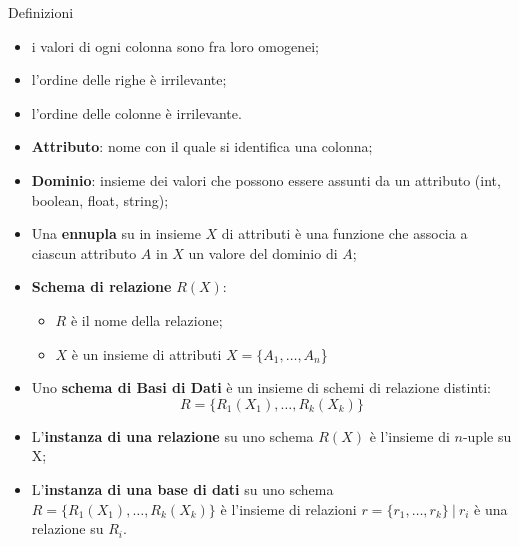 \begin{frame}[allowframebreaks]{Definizioni}
\begin{itemize}
            \item i valori di ogni colonna sono fra loro omogenei;
            \item l'ordine delle righe \`e irrilevante;
            \item l'ordine delle colonne \`e irrilevante.
        \end{itemize}
        \framebreak
        \begin{itemize}
            \item \textbf{Attributo}: nome con il quale si identifica una colonna;
            \item \textbf{Dominio}: insieme dei valori che possono essere assunti da un attributo (int, boolean, float, string);
            \item Una \textbf{ennupla} su in insieme $X$ di attributi \`e una funzione che associa a ciascun attributo $A$ in $X$ un valore del dominio di $A$;
            \item \textbf{Schema di relazione} $R(X)$:
            \begin{itemize}
                \item $R$ \`e il nome della relazione;
                \item $X$ \`e un insieme di attributi $X=\{A_1, \dotsc, A_n$\}
            \end{itemize}
            \item Uno \textbf{schema di Basi di Dati} \`e un insieme di schemi di relazione distinti:
            \[ R=\{R_1(X_1),\dotsc,R_k(X_k)\}\]
            \item L'\textbf{instanza di una relazione} su uno schema $R(X)$ \`e l'insieme di $n$-uple su X;
            \item L'\textbf{instanza di una base di dati} su uno schema $R=\{R_1(X_1),\dotsc,R_k(X_k)\}$ \`e l'insieme di relazioni $r=\{r_1,\dotsc,r_k\}~|~r_i$ \`e una relazione su $R_i$.
        \end{itemize}
    \end{frame}
